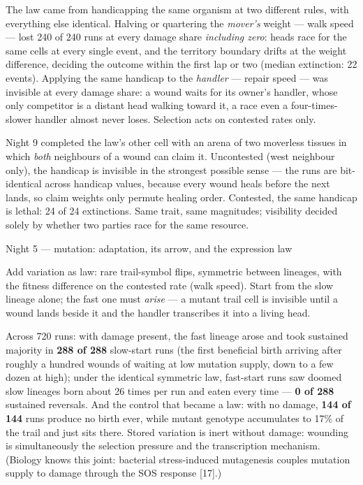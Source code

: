 The law came from handicapping the same organism at two different
rules, with everything else identical. Halving or
quartering the {\it mover's} weight --- walk speed --- lost 240 of
240 runs at every damage share {\it including zero}: heads race
for the same cells at every single event, and the territory
boundary drifts at the weight difference, deciding the outcome
within the first lap or two (median extinction: 22 events).
Applying the same handicap to the {\it handler} --- repair speed
--- was invisible at every damage share: a wound waits for its
owner's handler, whose only competitor is a distant head walking
toward it, a race even a four-times-slower handler almost never
loses.  Selection acts on contested rates
only.

Night 9 completed the law's other cell with an arena of two
moverless tissues in which {\it both} neighbours of a wound can
claim it. Uncontested (west neighbour only), the handicap is
invisible in the strongest possible sense --- the runs are
bit-identical across handicap values, because every wound heals
before the next lands, so claim weights only permute healing
order. Contested, the same handicap is lethal: 24 of 24
extinctions. Same trait, same magnitudes; visibility decided
solely by whether two parties race for the same resource.

\secc Night 5 --- mutation: adaptation, its arrow, and the expression law

Add variation as law: rare trail-symbol flips, symmetric between
lineages, with the fitness difference on the contested rate (walk
speed). Start from the slow lineage alone; the fast one must {\it
arise} --- a mutant trail cell is invisible until a wound lands
beside it and the handler transcribes it into a living head.

Across 720 runs: with damage present, the fast lineage arose and
took sustained majority in {\bf 288 of 288} slow-start runs (the
first beneficial birth arriving after roughly a hundred wounds of
waiting at low mutation supply, down to a few dozen at high); under
the identical symmetric law, fast-start runs saw doomed slow
lineages born about 26 times per run and eaten every time --- {\bf
0 of 288} sustained reversals. And the control that became a law:
with no damage, {\bf 144 of 144} runs produce no birth ever, while
mutant genotype accumulates to 17\% of the trail and just sits
there.  Stored variation is inert without damage:
wounding is simultaneously the selection pressure and the
transcription mechanism. (Biology knows this joint: bacterial
stress-induced mutagenesis couples mutation supply to damage
through the SOS response [17].)

